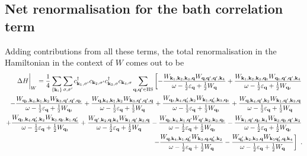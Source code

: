 \documentclass{revtex4-2}
\begin{document}
\subsection{Net renormalisation for the bath correlation term}
Adding contributions from all these terms, the total renormalisation in the Hamiltonian in the context of \(W\) comes out to be
\begin{equation}\begin{aligned}
	\Delta H\bigg|_{W} = \frac{1}{4}\sum_{\left\{ {\bf k}_i \right\}}\sum_{\sigma,\sigma^\prime} c^\dagger_{{\bf k}_1,\sigma^\prime}c_{{\bf k}_2,\sigma^\prime}c^\dagger_{{\bf k}_3,\sigma} c_{{\bf k}_4,\sigma} \sum_{{\bf q}, {\bf q}^\prime \in \text{HS}}\left[-\frac{W_{{\bf k}_1,{\bf k}_2,{\bf k}_3,{\bf q}} W_{{\bf q},{{\bf q}^\prime},{{\bf q}^\prime},{\bf k}_4}}{\omega - \frac{1}{2}\varepsilon_{{\bf q}} + \frac{1}{2}W_{{\bf q}}} + \frac{W_{{\bf k}_1,{\bf k}_2,{\bf k}_3,{\bf q}_t} W_{{\bf q}_t,{{\bf q}^\prime},{{\bf q}^\prime},{\bf k}_4}}{\omega - \frac{1}{2}\varepsilon_{{\bf q}} + \frac{1}{2}W_{{\bf q}_t}} \right.\\
\left.- \frac{W_{{\bf q}_t,{\bf k}_4,{\bf k}_1,{\bf k}_2} W_{{\bf k}_3,{{\bf q}^\prime},{{\bf q}^\prime},{\bf q}_t}}{\omega - \frac{1}{2}\varepsilon_{{\bf q}} + \frac{1}{2}W_{{\bf q}_t}}
 + \frac{W_{{\bf q},{\bf k}_4,{\bf k}_1,{\bf k}_2} W_{{\bf k}_3,{{\bf q}^\prime},{{\bf q}^\prime},{\bf q}}}{\omega - \frac{1}{2}\varepsilon_{{\bf q}} + \frac{1}{2}W_{{\bf q}}}
 + \frac{W_{{\bf q}_t,{\bf k}_4, {\bf q}_t^\prime, {\bf k}_2} W_{{\bf k}_1,{\bf q}_t^\prime, {\bf k}_3, {\bf q}_t}}{\omega - \frac{1}{2}\varepsilon_{{\bf q}} + \frac{1}{2}W_{{\bf q}_t}} + \frac{W_{{\bf q},{\bf k}_4, {\bf q}^\prime, {\bf k}_2} W_{{\bf k}_1,{\bf q}^\prime, {\bf k}_3, {\bf q}}}{\omega - \frac{1}{2}\varepsilon_{{\bf q}} + \frac{1}{2}W_{{\bf q}}}\right.\\
\left.+ \frac{W_{{\bf q}_t,{\bf k}_4, {\bf q}_t^\prime, {\bf k}_2} W_{{\bf k}_3, {\bf q}_t, {\bf k}_1,{\bf q}_t^\prime}}{\omega - \frac{1}{2}\varepsilon_{{\bf q}} + \frac{1}{2}W_{{\bf q}_t}} 
+ \frac{W_{{\bf q}^\prime, {\bf k}_2, {\bf q},{\bf k}_4} W_{{\bf k}_1,{\bf q}^\prime, {\bf k}_3, {\bf q}}}{\omega - \frac{1}{2}\varepsilon_{{\bf q}} + \frac{1}{2}W_{{\bf q}}} - \frac{W_{{\bf q}_t,{\bf k}_4, {\bf k}_1, {\bf q}^\prime} W_{{\bf q}^\prime, {\bf k}_2, {\bf k}_3, {\bf q}_t}}{\omega - \frac{1}{2}\varepsilon_{{\bf q}}  + \frac{1}{2}W_{{\bf q}_t}}
- \frac{W_{{\bf k}_1, {\bf q}^\prime, {\bf q}_t,{\bf k}_4} W_{{\bf k}_3, {\bf q}_t, {\bf q}^\prime, {\bf k}_2}}{\omega - \frac{1}{2}\varepsilon_{{\bf q}}  + \frac{1}{2}W_{{\bf q}_t}} \right.\\
\left.- \frac{W_{{\bf q},{\bf k}_4, {\bf k}_1, {\bf q}_t^\prime} W_{{\bf k}_3, {\bf q}, {\bf q}_t^\prime, {\bf k}_2}}{\omega - \frac{1}{2}\varepsilon_{{\bf q}}  + \frac{1}{2}W_{{\bf q}}} - \frac{W_{{\bf q}_t^\prime, {\bf k}_2, {\bf k}_3, {\bf q}} W_{{\bf k}_1 {\bf q}_t^\prime, {\bf q}, {\bf k}_4}}{\omega - \frac{1}{2}\varepsilon_{{\bf q}}  + \frac{1}{2}W_{{\bf q}}} \right]~.
\end{aligned}\end{equation}
\end{document}
